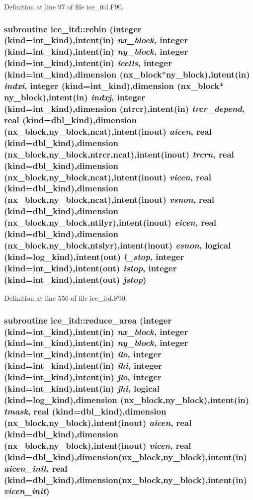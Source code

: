 Definition at line 97 of file ice\_\-itd.F90.\hypertarget{namespaceice__itd_a9c2920aedaba5102293185bec0142577}{
\subsubsection[{rebin}]{\setlength{\rightskip}{0pt plus 5cm}subroutine ice\_\-itd::rebin (integer (kind=int\_\-kind),intent(in) {\em nx\_\-block}, \/  integer (kind=int\_\-kind),intent(in) {\em ny\_\-block}, \/  integer (kind=int\_\-kind),intent(in) {\em icells}, \/  integer (kind=int\_\-kind),dimension (nx\_\-block$\ast$ny\_\-block),intent(in) {\em indxi}, \/  integer (kind=int\_\-kind),dimension (nx\_\-block$\ast$ny\_\-block),intent(in) {\em indxj}, \/  integer (kind=int\_\-kind),dimension (ntrcr),intent(in) {\em trcr\_\-depend}, \/  real (kind=dbl\_\-kind),dimension (nx\_\-block,ny\_\-block,ncat),intent(inout) {\em aicen}, \/  real (kind=dbl\_\-kind),dimension (nx\_\-block,ny\_\-block,ntrcr,ncat),intent(inout) {\em trcrn}, \/  real (kind=dbl\_\-kind),dimension (nx\_\-block,ny\_\-block,ncat),intent(inout) {\em vicen}, \/  real (kind=dbl\_\-kind),dimension (nx\_\-block,ny\_\-block,ncat),intent(inout) {\em vsnon}, \/  real (kind=dbl\_\-kind),dimension (nx\_\-block,ny\_\-block,ntilyr),intent(inout) {\em eicen}, \/  real (kind=dbl\_\-kind),dimension (nx\_\-block,ny\_\-block,ntslyr),intent(inout) {\em esnon}, \/  logical (kind=log\_\-kind),intent(out) {\em l\_\-stop}, \/  integer (kind=int\_\-kind),intent(out) {\em istop}, \/  integer (kind=int\_\-kind),intent(out) {\em jstop})}}
\label{namespaceice__itd_a9c2920aedaba5102293185bec0142577}


Definition at line 556 of file ice\_\-itd.F90.\hypertarget{namespaceice__itd_aebf0bc54e5651ee1e36e7562ecaa4d73}{
\subsubsection[{reduce\_\-area}]{\setlength{\rightskip}{0pt plus 5cm}subroutine ice\_\-itd::reduce\_\-area (integer (kind=int\_\-kind),intent(in) {\em nx\_\-block}, \/  integer (kind=int\_\-kind),intent(in) {\em ny\_\-block}, \/  integer (kind=int\_\-kind),intent(in) {\em ilo}, \/  integer (kind=int\_\-kind),intent(in) {\em ihi}, \/  integer (kind=int\_\-kind),intent(in) {\em jlo}, \/  integer (kind=int\_\-kind),intent(in) {\em jhi}, \/  logical (kind=log\_\-kind),dimension (nx\_\-block,ny\_\-block),intent(in) {\em tmask}, \/  real (kind=dbl\_\-kind),dimension (nx\_\-block,ny\_\-block),intent(inout) {\em aicen}, \/  real (kind=dbl\_\-kind),dimension (nx\_\-block,ny\_\-block),intent(inout) {\em vicen}, \/  real (kind=dbl\_\-kind),dimension(nx\_\-block,ny\_\-block),intent(in) {\em aicen\_\-init}, \/  real (kind=dbl\_\-kind),dimension(nx\_\-block,ny\_\-block),intent(in) {\em vicen\_\-init})}}
\label{namespaceice__itd_aebf0bc54e5651ee1e36e7562ecaa4d73}



